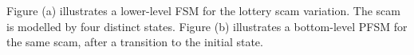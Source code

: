 Figure (a) illustrates a lower-level FSM for the lottery scam variation. The scam is modelled by four distinct states. Figure (b) illustrates a bottom-level PFSM for the same scam, after a transition to the initial state.

\begin{figure}
  \centering
  ~ %
  ~ %
\end{figure}

